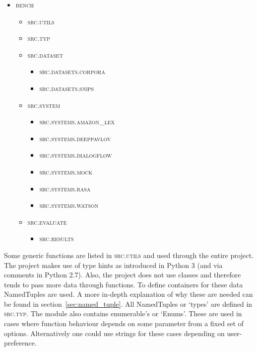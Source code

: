\begin{itemize}
    \item \textsc{bench}
    \begin{itemize}
        \item \textsc{src.utils}
        \item \textsc{src.typ}
        \item \textsc{src.dataset}
        \begin{itemize}
            \item \textsc{src.datasets.corpora}
            \item \textsc{src.datasets.snips}
        \end{itemize}
        \item \textsc{src.system}
        \begin{itemize}
            \item \textsc{src.systems.amazon\_lex}
            \item \textsc{src.systems.deeppavlov}
            \item \textsc{src.systems.dialogflow}
            \item \textsc{src.systems.mock}
            \item \textsc{src.systems.rasa}
            \item \textsc{src.systems.watson}
        \end{itemize}
        \item \textsc{src.evaluate}
        \begin{itemize}
            \item \textsc{src.results}
        \end{itemize}
    \end{itemize}
\end{itemize}

Some generic functions are listed in \textsc{src.utils} and used through the entire project.
The project makes use of type hints as introduced in Python 3 (and via comments in Python 2.7).
Also, the project does not use classes and therefore tends to pass more data through functions.
To define containers for these data NamedTuples are used.
A more in-depth explanation of why these are needed can be found in section~\ref{sec:named_tuple}.
All NamedTuples or `types' are defined in \textsc{src.typ}.
The module also contains enumerable's or `Enums'.
These are used in cases where function behaviour depends on some parameter from a fixed set of options.
Alternatively one could use strings for these cases depending on user-preference.

